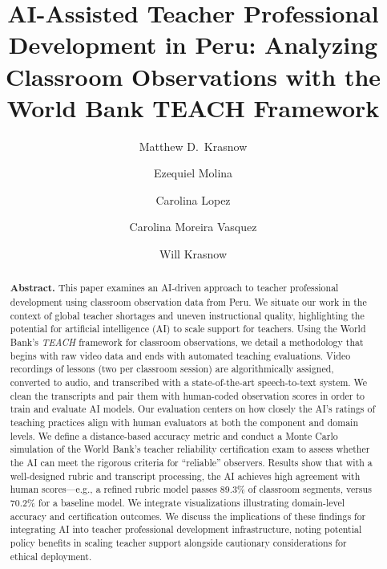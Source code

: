 \documentclass[12pt]{article}
\begin{document}
\title{AI-Assisted Teacher Professional Development in Peru: Analyzing Classroom Observations with the World Bank TEACH Framework}
\author[1]{Matthew D.\ Krasnow}
\author[2]{Ezequiel Molina}
\author[2]{Carolina Lopez}
\author[3]{Carolina Moreira Vasquez}
\author[1]{Will Krasnow}


\date{}
\maketitle

\begin{abstract}
\noindent \textbf{Abstract.} This paper examines an AI-driven approach to teacher professional development using classroom observation data from Peru. We situate our work in the context of global teacher shortages and uneven instructional quality, highlighting the potential for artificial intelligence (AI) to scale support for teachers. Using the World Bank’s \textit{TEACH} framework for classroom observations, we detail a methodology that begins with raw video data and ends with automated teaching evaluations. Video recordings of lessons (two per classroom session) are algorithmically assigned, converted to audio, and transcribed with a state-of-the-art speech-to-text system. We clean the transcripts and pair them with human-coded observation scores in order to train and evaluate AI models. Our evaluation centers on how closely the AI’s ratings of teaching practices align with human evaluators at both the component and domain levels. We define a distance-based accuracy metric and conduct a Monte Carlo simulation of the World Bank’s teacher reliability certification exam to assess whether the AI can meet the rigorous criteria for “reliable” observers. Results show that with a well-designed rubric and transcript processing, the AI achieves high agreement with human scores—e.g., a refined rubric model passes 89.3\% of classroom segments, versus 70.2\% for a baseline model. We integrate visualizations illustrating domain-level accuracy and certification outcomes. We discuss the implications of these findings for integrating AI into teacher professional development infrastructure, noting potential policy benefits in scaling teacher support alongside cautionary considerations for ethical deployment.
\end{abstract}
\end{document}

